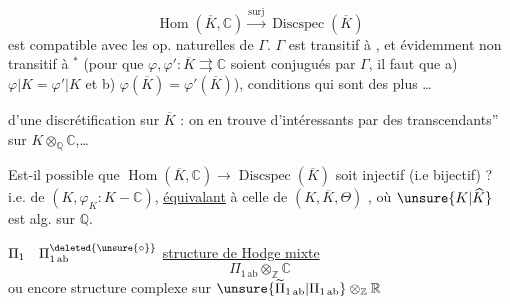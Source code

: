 \[
\operatorname{Hom}(\overline K,\mathbb C)\xrightarrow{\mathrm{surj}}
\operatorname{Discspec}(\overline K)
\]
est  compatible avec les op. naturelles de $\Gamma$.
 $\Gamma$ est transitif à
, et évidemment non transitif à
$^*$ (pour que
$\varphi,\varphi':\overline K\rightrightarrows\mathbb C$ soient conjugués par $\Gamma$,
il faut que a) $\varphi|K=\varphi'|K$ et b)
$\varphi(\overline K)=\varphi'(\overline K)$), conditions qui sont des plus
\ldots
{}

\uline{} d'une discrétification sur $\overline K$ : on en trouve
d'intéressants par  des
 transcendants'' sur
$K\otimes_{\mathbb Q}\mathbb C$,\ldots\deleted{\unsure{\ldots}}

Est-il possible que $\operatorname{Hom}(\overline K,\mathbb C)\longrightarrow
\operatorname{Discspec}(\overline K)$ soit injectif (i.e bijectif) ?
i.e. de $(K,\varphi_K:K\mathbin{-}\mathbb C)$, \uline{équivalant} à celle
de $(K,\overline K,\Theta)$ ,
 où $\unsure{K|\widehat K}$ est alg. sur $\mathbb Q$.

$\Pi_1\quad\Pi_{1\,\mathrm{ab}}^{\deleted{\unsure{\circ}}}$\quad
\uline{structure de Hodge mixte}
\[
\Pi_{1\,\mathrm{ab}}\otimes_{\mathbb Z}\mathbb C
\]
ou encore structure complexe sur $\unsure{\widetilde\Pi_{1\,\mathrm{ab}}|\Pi_{1\,\mathrm{ab}}}\otimes_{\mathbb Z}\mathbb R$
